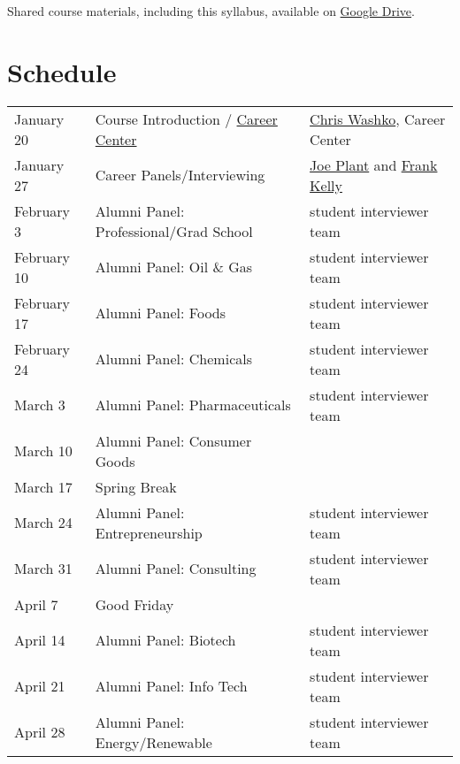 \documentclass[11pt]{article}
\begin{document}
\noindent Shared course materials, including this syllabus, available on \href{https://drive.google.com/drive/folders/1r\_wSSi8Jvphhkkfh8ujKThlI-RCvBMRM?usp=share\_link}{Google Drive}.

\section{Schedule}
\label{sec:orgd8a7e0e}
\begin{center}
\begin{tabular}{lll}
January 20 & Course Introduction / \href{./Resources/2022-CareerCenter-1.pdf}{Career Center} & \href{http://linkedin.com/in/chriswashko}{Chris Washko}, Career Center\\
January 27 & Career Panels/Interviewing & \href{https://www.linkedin.com/in/joe-plant-1ba4691/}{Joe Plant} and  \href{https://www.linkedin.com/in/frank-kelly-7a7109b/}{Frank Kelly}\\
February 3 & Alumni Panel: Professional/Grad School & student interviewer team\\
February 10 & Alumni Panel: Oil \& Gas & student interviewer team\\
February 17 & Alumni Panel: Foods & student interviewer team\\
February 24 & Alumni Panel: Chemicals & student interviewer team\\
March 3 & Alumni Panel: Pharmaceuticals & student interviewer team\\
March 10 & Alumni Panel: Consumer Goods & \\
March 17 & Spring Break & \\
March 24 & Alumni Panel: Entrepreneurship & student interviewer team\\
March 31 & Alumni Panel: Consulting & student interviewer team\\
April 7 & Good Friday & \\
April 14 & Alumni Panel: Biotech & student interviewer team\\
April 21 & Alumni Panel: Info Tech & student interviewer team\\
April 28 & Alumni Panel: Energy/Renewable & student interviewer team\\
\end{tabular}
\end{center}
\end{document}

